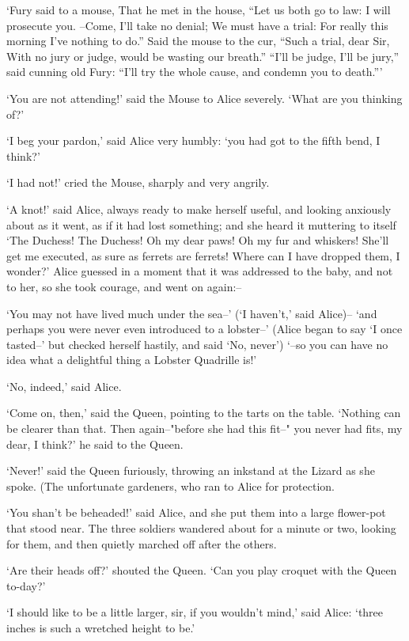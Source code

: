 \documentclass[statementpaper,twoside,openany]{memoir}
\begin{document}
`Fury said to a mouse, That he met in the house, ``Let us both go to law: I will prosecute you. --Come, I'll take no denial; We must have a trial: For really this morning I've nothing to do.'' Said the mouse to the cur, ``Such a trial, dear Sir, With no jury or judge, would be wasting our breath.'' ``I'll be judge, I'll be jury,'' said cunning old Fury: ``I'll try the whole cause, and condemn you to death.'''

`You are not attending!' said the Mouse to Alice severely. `What are you thinking of?'

`I beg your pardon,' said Alice very humbly: `you had got to the fifth bend, I think?'

`I had not!' cried the Mouse, sharply and very angrily.

`A knot!' said Alice, always ready to make herself useful, and looking anxiously about as it went, as if it had lost something; and she heard it muttering to itself `The Duchess! The Duchess! Oh my dear paws! Oh my fur and whiskers! She'll get me executed, as sure as ferrets are ferrets! Where can I have dropped them, I wonder?' Alice guessed in a moment that it was addressed to the baby, and not to her, so she took courage, and went on again:--

`You may not have lived much under the sea--' (`I haven't,' said Alice)-- `and perhaps you were never even introduced to a lobster--' (Alice began to say `I once tasted--' but checked herself hastily, and said `No, never') `--so you can have no idea what a delightful thing a Lobster Quadrille is!'

`No, indeed,' said Alice.

`Come on, then,' said the Queen, pointing to the tarts on the table. `Nothing can be clearer than that. Then again--"before she had this fit--" you never had fits, my dear, I think?' he said to the Queen.

`Never!' said the Queen furiously, throwing an inkstand at the Lizard as she spoke. (The unfortunate gardeners, who ran to Alice for protection.

`You shan't be beheaded!' said Alice, and she put them into a large flower-pot that stood near. The three soldiers wandered about for a minute or two, looking for them, and then quietly marched off after the others.

`Are their heads off?' shouted the Queen. `Can you play croquet with the Queen to-day?'

`I should like to be a little larger, sir, if you wouldn't mind,' said Alice: `three inches is such a wretched height to be.'
\end{document}
